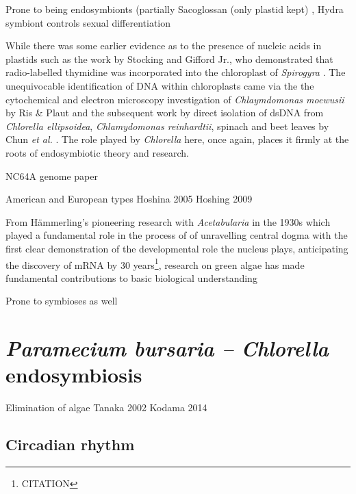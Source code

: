 Prone to being endosymbionts (partially Sacoglossan (only plastid kept) \citep{Christa2014},
Hydra symbiont controls sexual differentiation \citep{Bosch2012}




While there was some earlier evidence as to the presence of nucleic acids in 
plastids such as the work by Stocking and Gifford Jr., who demonstrated that
radio-labelled thymidine was incorporated into the chloroplast of \textit{Spirogyra}
\citep{Stocking1959}.
The unequivocable identification of DNA within chloroplasts came via the 
the cytochemical and electron microscopy investigation of \textit{Chlaymdomonas moewusii} 
by Ris \& Plaut \citep{Ris1962} and the subsequent work by direct isolation of
dsDNA from \textit{Chlorella ellipsoidea}, \textit{Chlamydomonas reinhardtii}, spinach
and beet leaves by Chun \textit{et al.} \citep{Chun1963}. The role played by
\textit{Chlorella} here, once again, places it firmly at the roots of endosymbiotic
theory and research.







NC64A genome paper

American and European types Hoshina 2005
Hoshing 2009




From H\"ammerling's pioneering research with \textit{Acetabularia} in the 1930s 
which played a fundamental role in the process of 
of unravelling central dogma with the first clear demonstration of the 
developmental role the nucleus plays, anticipating the discovery of mRNA by 30 years\footnote{CITATION}, research on green algae has made fundamental contributions
to basic biological understanding

Prone to symbioses as well


\section{\textit{Paramecium bursaria – Chlorella} endosymbiosis}

Elimination of algae Tanaka 2002 
Kodama 2014

\subsection{Circadian rhythm}

